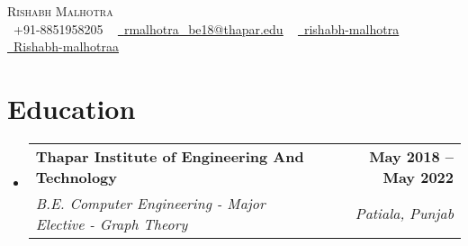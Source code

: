 \documentclass[letterpaper,11pt]{article}
\makeatletter
\newcommand{\resumeSubheading}[4]{
  \vspace{-2pt}\item
    \begin{tabular*}{1.0\textwidth}[t]{l@{\extracolsep{\fill}}r}
      \textbf{#1} & \textbf{\small #2} \\
      \textit{\small#3} & \textit{\small #4} \\
    \end{tabular*}\vspace{-7pt}
}
\newcommand{\resumeSubHeadingListStart}{\begin{itemize}[leftmargin=0.0in, label={}]}
\newcommand{\resumeSubHeadingListEnd}{\end{itemize}}
\makeatother
\begin{document}

\begin{center}
    {\Huge \scshape Rishabh Malhotra} \\ \vspace{3pt}
    \small \raisebox{-0.1\height}\faPhone\ +91-8851958205 ~ \href{mailto:rmalhotra_be18@thapar.edu}{\raisebox{-0.2\height}\faEnvelope\  \underline{rmalhotra\_be18@thapar.edu}} ~ 
    \href{https://linkedin.com/in/rishabh-malhotra-4536a418b/}{\raisebox{-0.2\height}\faLinkedin\ \underline{rishabh-malhotra}}  ~
    \href{https://github.com/Rishabh-malhotraa}{\raisebox{-0.2\height}\faGithub\ \underline{Rishabh-malhotraa}}
    \vspace{-8pt}
\end{center}


\section{Education}
  \resumeSubHeadingListStart
    \resumeSubheading
      {Thapar Institute of Engineering And Technology}{May 2018 -- May 2022}
      {B.E. Computer Engineering - Major Elective - Graph Theory}{Patiala, Punjab}
  \resumeSubHeadingListEnd

\end{document}
